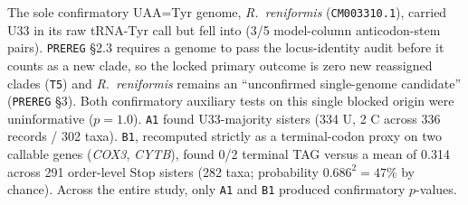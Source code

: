 \documentclass[11pt, a4paper]{article}
\begin{document}
The sole confirmatory UAA=Tyr genome, \textit{R.\ reniformis} (\texttt{CM003310.1}), carried U33 in its raw tRNA-Tyr call but fell into  (3/5 model-column anticodon-stem pairs). \texttt{PREREG} \S 2.3 requires a genome to pass the locus-identity audit before it counts as a new clade, so the locked primary outcome is zero new reassigned clades (\texttt{T5}) and \textit{R.\ reniformis} remains an ``unconfirmed single-genome candidate'' (\texttt{PREREG} \S 3). Both confirmatory auxiliary tests on this single blocked origin were uninformative ($p = 1.0$). \texttt{A1} found U33-majority sisters (334 U, 2 C across 336 records / 302 taxa). \texttt{B1}, recomputed strictly as a terminal-codon proxy on two callable genes (\textit{COX3}, \textit{CYTB}), found 0/2 terminal TAG versus a mean of 0.314 across 291 order-level Stop sisters (282 taxa; probability $0.686^2 = 47\%$ by chance). Across the entire study, only \texttt{A1} and \texttt{B1} produced confirmatory $p$-values.
\end{document}
